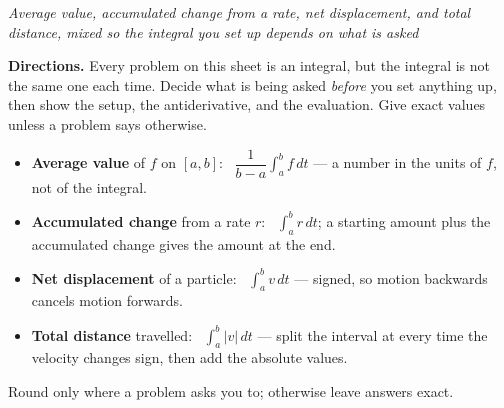 \documentclass[12pt]{article}
\begin{document}

\begin{center}
\textit{Average value, accumulated change from a rate, net displacement, and
total distance, mixed so the integral you set up depends on what is asked}
\end{center}

\noindent\textbf{Directions.} Every problem on this sheet is an integral, but
the integral is not the same one each time. Decide what is being asked
\emph{before} you set anything up, then show the setup, the antiderivative, and
the evaluation. Give exact values unless a problem says otherwise.

\begin{itemize}[leftmargin=1.2cm, itemsep=2pt, topsep=3pt]
\item \textbf{Average value} of $f$ on $[a, b]$: \ $\dfrac{1}{b-a}\displaystyle\int_a^b f\,dt$ --- a
number in the units of $f$, not of the integral.
\item \textbf{Accumulated change} from a rate $r$: \ $\displaystyle\int_a^b r\,dt$; a starting
amount plus the accumulated change gives the amount at the end.
\item \textbf{Net displacement} of a particle: \ $\displaystyle\int_a^b v\,dt$ --- signed, so
motion backwards cancels motion forwards.
\item \textbf{Total distance} travelled: \ $\displaystyle\int_a^b |v|\,dt$ --- split the interval
at every time the velocity changes sign, then add the absolute values.
\end{itemize}

\vspace{0.1cm}
\noindent Round only where a problem asks you to; otherwise leave answers exact.



\end{document}
